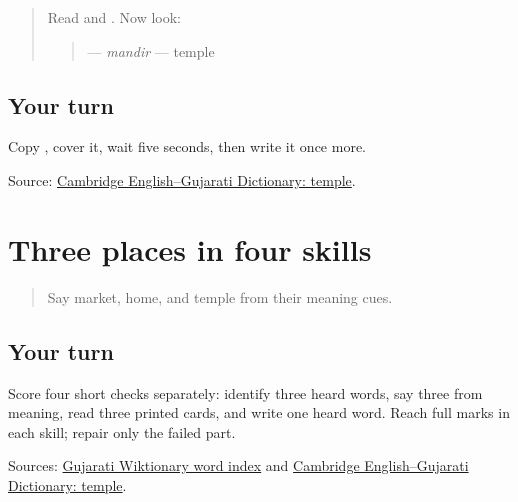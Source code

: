 \label{lesson:GU-C20-mandir}



\begin{quote}
Read \textbf{} and \textbf{}. Now look:

\begin{quote}
\textbf{} — \emph{mandir} — temple
\end{quote}
\end{quote}

\subsection*{Your turn}

Copy \textbf{}, cover it, wait five seconds, then write it once more.

\begin{tcolorbox}[breakable,colback=teal!4,colframe=teal!35!black,title={Before you move on}]
Source: \href{https://dictionary.cambridge.org/dictionary/english-gujarati/temple}{Cambridge English–Gujarati Dictionary: temple}.
\end{tcolorbox}
\section[\texorpdfstring{\gu{બજાર} — \gu{ઘર} — \gu{મંદિર} (bajār — ghar — mandir)}{બજાર — ઘર — મંદિર (bajār — ghar — mandir)}]{Three places in four skills}

\label{lesson:GU-C20-places-three}



\begin{quote}
Say market, home, and temple from their meaning cues.
\end{quote}

\subsection*{Your turn}
Score four short checks separately: identify three heard words, say three from meaning, read three printed cards, and write one heard word. Reach full marks in each skill; repair only the failed part.

\begin{tcolorbox}[breakable,colback=teal!4,colframe=teal!35!black,title={Before you move on}]
Sources: \href{https://gu.wiktionary.org/wiki/\%E0\%AA\%B5\%E0\%AA\%BF\%E0\%AA\%95\%E0\%AA\%BF\%E0\%AA\%95\%E0\%AB\%8B\%E0\%AA\%B6:\%E0\%AA\%B6\%E0\%AA\%AC\%E0\%AB\%8D\%E0\%AA\%A6\_\%E0\%AA\%85\%E0\%AA\%A8\%E0\%AB\%81\%E0\%AA\%95\%E0\%AB\%8D\%E0\%AA\%B0\%E0\%AA\%AE\%E0\%AA\%A3\%E0\%AA\%BF\%E0\%AA\%95\%E0\%AA\%BE}{Gujarati Wiktionary word index} and \href{https://dictionary.cambridge.org/dictionary/english-gujarati/temple}{Cambridge English–Gujarati Dictionary: temple}.
\end{tcolorbox}
